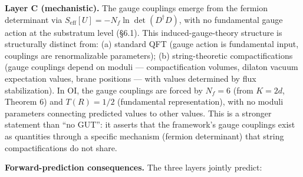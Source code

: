 \documentclass[
]{article}
\begin{document}
\textbf{Layer C (mechanistic).} The gauge couplings emerge from the
fermion determinant via
\(S_{\mathrm{eff}}[U] = -N_f \ln \det(D^\dagger D)\), with no
fundamental gauge action at the substratum level (§6.1). This
induced-gauge-theory structure is structurally distinct from: (a)
standard QFT (gauge action is fundamental input, couplings are
renormalizable parameters); (b) string-theoretic compactifications
(gauge couplings depend on moduli --- compactification volumes, dilaton
vacuum expectation values, brane positions --- with values determined by
flux stabilization). In OI, the gauge couplings are forced by
\(N_f = 6\) (from \(K = 2d\), Theorem 6) and \(T(R) = 1/2\) (fundamental
representation), with no moduli parameters connecting predicted values
to other values. This is a stronger statement than ``no GUT'': it
asserts that the framework's gauge couplings exist as quantities through
a specific mechanism (fermion determinant) that string compactifications
do not share.

\textbf{Forward-prediction consequences.} The three layers jointly
predict:
\end{document}
